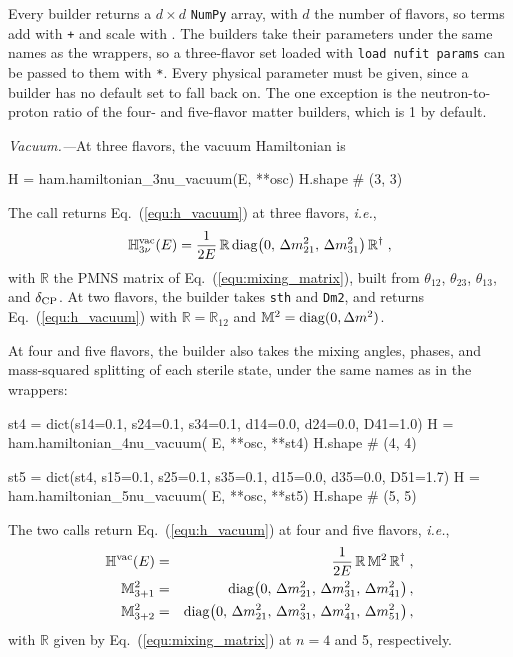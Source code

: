 \documentclass[final,5p,times,twocolumn,sort,compress]{elsarticle}
\makeatletter
\newcommand{\ie}{{\it i.e.}}
\newcommand{\eq}{Eq.}
\DeclareRobustCommand{\_}{%
  \ifmmode\nfss@text{\textunderscore}\else\textunderscore\allowbreak\fi}
\newcommand{\equ}[1]{\eq~(\ref{equ:#1})}
\makeatother
\begin{document}
Every builder returns a $d \times d$ {\tt NumPy} array, with $d$ the number of flavors, so terms add with {\tt +} and scale with {\tt *}. The builders take their parameters under the same names as the wrappers, so a three-flavor set loaded with {\tt load\_nufit\_params} can be passed to them with {\tt **}. Every physical parameter must be given, since a builder has no default set to fall back on. The one exception is the neutron-to-proton ratio of the four- and five-flavor matter builders, which is 1 by default.

\smallskip

\textit{Vacuum.---}At three flavors, the vacuum Hamiltonian is
\begin{pysnip}
H = ham.hamiltonian_3nu_vacuum(E, **osc)
H.shape                        # (3, 3)
\end{pysnip}
The call returns \equ{h_vacuum} at three flavors, \ie,
\begin{equation}
 \label{equ:h_vacuum_3nu}
 \mathbb{H}_{3\nu}^{\rm vac}(E)
 =
 \frac{1}{2E}\,
 \mathbb{R}\,
 {\rm diag}\!\left(0,\, \Delta m^2_{21},\, \Delta m^2_{31}\right)
 \mathbb{R}^\dagger \;,
\end{equation}
with $\mathbb{R}$ the PMNS matrix of \equ{mixing_matrix}, built from $\theta_{12}$, $\theta_{23}$, $\theta_{13}$, and $\delta_{\rm CP}$. At two flavors, the builder takes {\tt sth} and {\tt Dm2}, and returns \equ{h_vacuum} with $\mathbb{R} = \mathbb{R}_{12}$ and $\mathbb{M}^2 = {\rm diag}(0, \Delta m^2)$.

At four and five flavors, the builder also takes the mixing angles, phases, and mass-squared splitting of each sterile state, under the same names as in the wrappers:
\begin{pysnip}
st4 = dict(s14=0.1, s24=0.1, s34=0.1,
           d14=0.0, d24=0.0, D41=1.0)
H = ham.hamiltonian_4nu_vacuum(
    E, **osc, **st4)
H.shape                        # (4, 4)

st5 = dict(st4, s15=0.1, s25=0.1, s35=0.1,
           d15=0.0, d35=0.0, D51=1.7)
H = ham.hamiltonian_5nu_vacuum(
    E, **osc, **st5)
H.shape                        # (5, 5)
\end{pysnip}
The two calls return \equ{h_vacuum} at four and five flavors, \ie,
\begin{eqnarray}
 \label{equ:h_vacuum_45nu}
 \mathbb{H}^{\rm vac}(E)
 &=&
 \frac{1}{2E}\,
 \mathbb{R}\,
 \mathbb{M}^2\,
 \mathbb{R}^\dagger \;,
 \nonumber \\
 \mathbb{M}^2_{3+1}
 &=&
 {\rm diag}\!\left(0,\, \Delta m^2_{21},\, \Delta m^2_{31},\, \Delta m^2_{41}\right) ,
 \nonumber \\
 \mathbb{M}^2_{3+2}
 &=&
 {\rm diag}\!\left(0,\, \Delta m^2_{21},\, \Delta m^2_{31},\, \Delta m^2_{41},\, \Delta m^2_{51}\right) ,
\end{eqnarray}
with $\mathbb{R}$ given by \equ{mixing_matrix} at $n = 4$ and 5, respectively.
\end{document}
